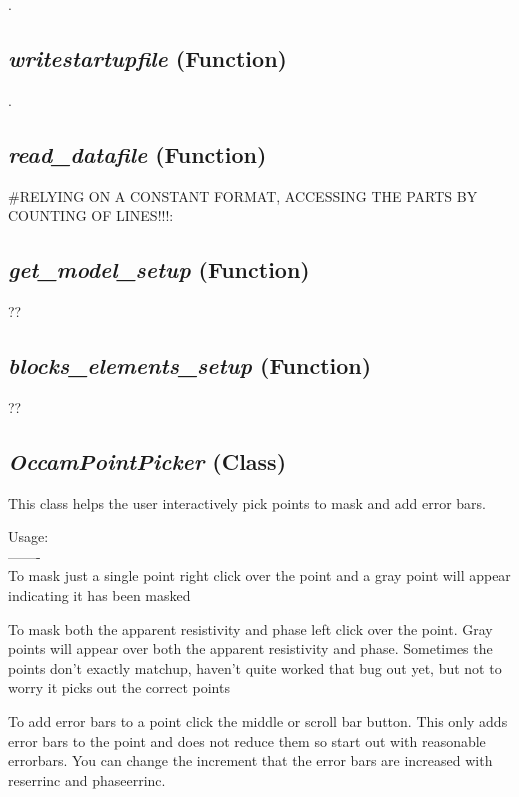 .

\subsection{\textit{writestartupfile} (Function)}
\label{ssec:.modeling.occamtools.writestartupfile}

.

\subsection{\textit{read\_datafile} (Function)}
\label{ssec:.modeling.occamtools.read_datafile}

    \#RELYING ON A CONSTANT FORMAT, ACCESSING THE PARTS BY COUNTING OF LINES!!!:


\subsection{\textit{get\_model\_setup} (Function)}
\label{ssec:.modeling.occamtools.get_model_setup}

??

\subsection{\textit{blocks\_elements\_setup} (Function)}
\label{ssec:.modeling.occamtools.blocks_elements_setup}

??


\subsection{\textit{OccamPointPicker} (Class)}
\label{ssec:.modeling.occamtools.OccamPointPicker}

This class helps the user interactively pick points to mask and add 
    error bars. 
    
    Usage:\\
    -------\\
    To mask just a single point right click over the point and a gray point 
    will appear indicating it has been masked
    
    To mask both the apparent resistivity and phase left click over the point.
    Gray points will appear over both the apparent resistivity and phase.  
    Sometimes the points don't exactly matchup, haven't quite worked that bug
    out yet, but not to worry it picks out the correct points
    
    To add error bars to a point click the middle or scroll bar button.  This
    only adds error bars to the point and does not reduce them so start out
    with reasonable errorbars.  You can change the increment that the error
    bars are increased with reserrinc and phaseerrinc.


